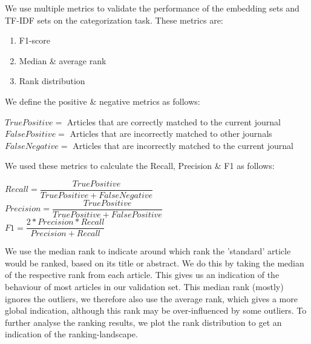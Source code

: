 \documentclass[../../Thesis.tex]{subfiles}
\begin{document}
We use multiple metrics to validate the performance of the embedding sets and TF-IDF sets on the categorization task. These metrics are:
\begin{enumerate}
\item{F1-score}
\item{Median \& average rank}
\item{Rank distribution}
\end{enumerate}
We define the positive \& negative metrics as follows:\\
\begin{jumpin}
$True Positive = $ Articles that are correctly matched to the current journal\\
$False Positive = $ Articles that are incorrectly matched to other journals\\
$False Negative = $ Articles that are incorrectly matched to the current journal\\
\end{jumpin}
We used these metrics to calculate the Recall, Precision \& F1 as follows:\\
\begin{jumpin}
$Recall = \dfrac{True Positive}{True Positive + False Negative}$\vspace{0.1in}\\
$Precision = \dfrac{True Positive}{True Positive + False Positive}$\vspace{0.1in}\\
$F1 = \dfrac{2 * Precision * Recall}{Precision + Recall}$
\end{jumpin}
We use the median rank to indicate around which rank the 'standard' article would be ranked, based on its title or abstract. We do this by taking the median of the respective rank from each article. This gives us an indication of the behaviour of most articles in our validation set. This median rank (mostly) ignores the outliers, we therefore also use the average rank, which gives a more global indication, although this rank may be over-influenced by some outliers.
To further analyse the ranking results, we plot the rank distribution to get an indication of the ranking-landscape.
\end{document}
